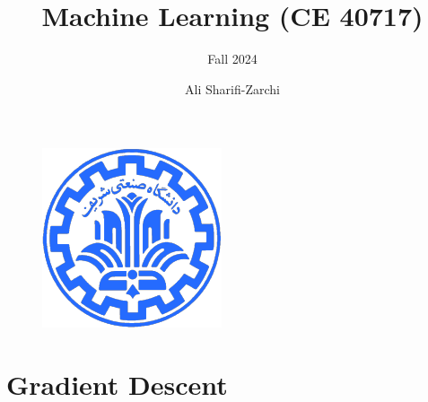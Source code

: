 \documentclass[serif, aspectratio=169]{beamer}
\author{Ali Sharifi-Zarchi}
\title{Machine Learning (CE 40717)}
\subtitle{Fall 2024}
\institute{
    CE Department \\
    Sharif University of Technology
}
\begin{document}
\begin{frame}
    \titlepage
    \vspace*{-0.6cm}
    \begin{figure}[htpb]
        \begin{center}
            \includegraphics[keepaspectratio, scale=0.25]{pic/sharif-main-logo.png}
        \end{center}
    \end{figure}
\end{frame}

\section{Gradient Descent}
\end{document}

